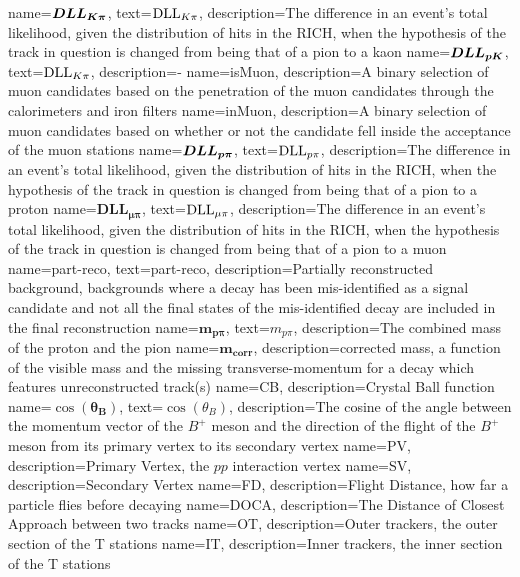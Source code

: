{
	name=$\mathbold{DLL_{\kaon\pi}}$,
		text=$\mathrm{DLL}_{{K}{\pi}}$,
		description={The difference in an event’s total likelihood, given the distribution of hits in the RICH, when the hypothesis of the track in question is changed from being that of a pion to a kaon
		}}
{
	name=$\mathbold{DLL_{\proton\kaon}}$,
		text=$\mathrm{DLL}_{{K}{\pi}}$,
		description={\dllppi-\dllkpi}}
{
	name=isMuon,
		description={A binary selection of muon candidates based on the penetration of the muon candidates through the calorimeters and iron filters}
}
{
	name=inMuon,
		description={A binary selection of muon candidates based on whether or not the candidate fell inside the acceptance of the muon stations}
}                                        
{
	name=$\mathbold{DLL_{\proton\pi}}$,
		text=$\mathrm{DLL}_{{p}{\pi}}$,
		description={The difference in an event’s total likelihood, given the distribution of hits in the RICH, when the hypothesis of the track in question is changed from being that of a pion to a proton}                
}
{
	name=$\mathbold{DLL_{\mu\pi}}$,
		text=$\mathrm{DLL}_{{\mu}\pi}$,
		description={The difference in an event’s total likelihood, given the distribution of hits in the RICH, when the hypothesis of the track in question is changed from being that of a pion to a muon 
		}}
{
	name=part-reco,
		text=part-reco,
		description={Partially reconstructed background, backgrounds where a decay has been mis-identified as a signal candidate and not all the final states of the mis-identified decay are included in the final reconstruction  
		}}
{
	name=$\mathbold{m_{p\pi}}$,
		text=$m_{p\pi}$,
		description={The combined mass of the proton and the pion}
}
{
	name=$\mathbold{m_{corr}}$,
		description={corrected mass, a function of the visible mass and the missing transverse-momentum for a decay which features unreconstructed track(s)}
}                 
{
	name=CB,
		description={Crystal Ball function}
}                 
{
	        name=$\cos(\mathbold{\theta_{B}})$,
                text=$\cos({\theta_{B}})$,
		description={The cosine of the angle between the momentum vector of the $B^{+}$ meson and the direction of the flight of the $B^{+}$ meson from its primary vertex to its secondary vertex }
}
{
	name=PV,
		description={Primary Vertex, the $pp$ interaction vertex}
}
{
	name=SV,
		description={Secondary Vertex}
}
{
	name=FD,
		description={Flight Distance, how far a particle flies before decaying}
}                                                                      
{
	name=DOCA,
		description={The Distance of Closest Approach between two tracks} 
}
{
	name=OT,
		description={Outer trackers, the outer section of the T stations} 
}
{
	name=IT,
		description={Inner trackers, the inner section of the T stations} 
}

